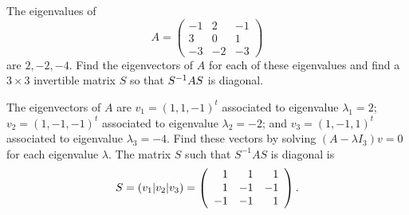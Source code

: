 \documentclass{ximera}
\begin{document}
\begin{exercise} \label{c10.3.2}
The eigenvalues of 
\[
A=\left(\begin{array}{rrr} -1 & 2 & -1\\ 3& 0 & 1 \\ -3 & -2 & -3 \end{array}
\right)
\]
are $2,-2,-4$.  Find the eigenvectors of $A$ for each of these eigenvalues and 
find a $3\times 3$ invertible matrix $S$ so that $S^{-1} AS$ is diagonal.

\begin{solution}

The eigenvectors of $A$ are $v_1 = (1,1,-1)^t$ associated to eigenvalue
$\lambda_1 = 2$; $v_2 = (1,-1,-1)^t$ associated to eigenvalue
$\lambda_2 = -2$; and $v_3 = (1,-1,1)^t$ associated to eigenvalue
$\lambda_3 = -4$.  Find these vectors by solving $(A - \lambda I_3)v = 0$
for each eigenvalue $\lambda$.  The matrix $S$ such that $S^{-1}AS$ is
diagonal is
\[
S = (v_1|v_2|v_3) = \left(\begin{array}{rrr} 1 & 1 & 1 \\ 1 & -1 & -1 \\ -1 & -1 & 1\end{array}\right).
\]

\end{solution}
\end{exercise} 
\end{document}
